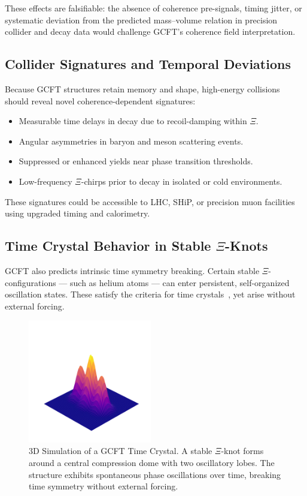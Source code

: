 These effects are falsifiable: the absence of coherence pre-signals, timing jitter, or systematic deviation from the predicted mass–volume relation in precision collider and decay data would challenge GCFT’s coherence field interpretation.


\subsection{Collider Signatures and Temporal Deviations}

Because GCFT structures retain memory and shape, high-energy collisions should reveal novel coherence-dependent signatures:

\begin{itemize}
  \item Measurable time delays in decay due to recoil-damping within $\Xi$.
  \item Angular asymmetries in baryon and meson scattering events.
  \item Suppressed or enhanced yields near phase transition thresholds.
  \item Low-frequency $\Xi$-chirps prior to decay in isolated or cold environments.
\end{itemize}

These signatures could be accessible to LHC, SHiP, or precision muon facilities using upgraded timing and calorimetry.

\subsection{\texorpdfstring{Time Crystal Behavior in Stable $\Xi$-Knots}{Time Crystal Behavior in Stable Xi-Knots}}

GCFT also predicts intrinsic time symmetry breaking. Certain stable $\Xi$-configurations — such as helium atoms — can enter persistent, self-organized oscillation states. These satisfy the criteria for time crystals~\cite{Wilczek2012}, yet arise without external forcing.

\begin{figure}[ht]
\centering
\includegraphics[width=0.48\textwidth]{figures/xi_time_crystal_3d_surface.png}
\caption{3D Simulation of a GCFT Time Crystal. A stable $\Xi$-knot forms around a central compression dome with two oscillatory lobes. The structure exhibits spontaneous phase oscillations over time, breaking time symmetry without external forcing.}
\label{fig:xi_time_crystal}
\end{figure}

